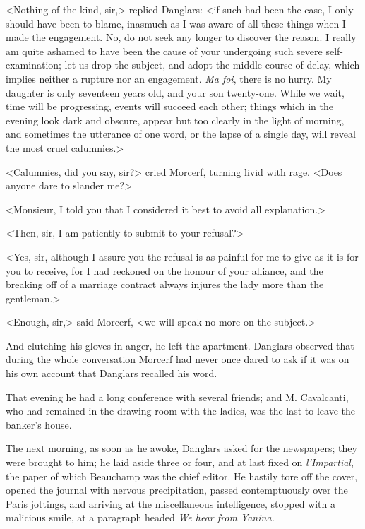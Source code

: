  <Nothing of the kind, sir,> replied Danglars: <if such had been the case, I only should have been to blame, inasmuch as I was aware of all these things when I made the engagement. No, do not seek any longer to discover the reason. I really am quite ashamed to have been the cause of your undergoing such severe self-examination; let us drop the subject, and adopt the middle course of delay, which implies neither a rupture nor an engagement. \textit{Ma foi}, there is no hurry. My daughter is only seventeen years old, and your son twenty-one. While we wait, time will be progressing, events will succeed each other; things which in the evening look dark and obscure, appear but too clearly in the light of morning, and sometimes the utterance of one word, or the lapse of a single day, will reveal the most cruel calumnies.> 

 <Calumnies, did you say, sir?> cried Morcerf, turning livid with rage. <Does anyone dare to slander me?> 

 <Monsieur, I told you that I considered it best to avoid all explanation.> 

 <Then, sir, I am patiently to submit to your refusal?> 

 <Yes, sir, although I assure you the refusal is as painful for me to give as it is for you to receive, for I had reckoned on the honour of your alliance, and the breaking off of a marriage contract always injures the lady more than the gentleman.> 

 <Enough, sir,> said Morcerf, <we will speak no more on the subject.> 

 And clutching his gloves in anger, he left the apartment. Danglars observed that during the whole conversation Morcerf had never once dared to ask if it was on his own account that Danglars recalled his word. 

 That evening he had a long conference with several friends; and M. Cavalcanti, who had remained in the drawing-room with the ladies, was the last to leave the banker's house. 

 The next morning, as soon as he awoke, Danglars asked for the newspapers; they were brought to him; he laid aside three or four, and at last fixed on \textit{l'Impartial}, the paper of which Beauchamp was the chief editor. He hastily tore off the cover, opened the journal with nervous precipitation, passed contemptuously over the Paris jottings, and arriving at the miscellaneous intelligence, stopped with a malicious smile, at a paragraph headed \textit{We hear from Yanina.}

